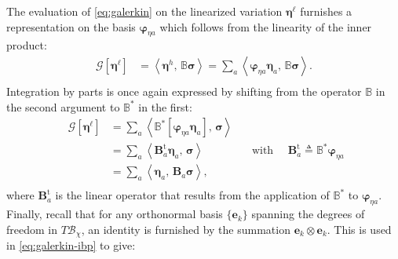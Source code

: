 The evaluation of \eqref{eq:galerkin}
on the linearized variation \(\bm{\eta}^\ell\)
furnishes a representation on the basis 
\(\bm{\varphi}_{\eta a}\) which
follows 
from the linearity of the inner product:
\begin{equation}
  \begin{aligned}
  \mathcal{G}\left[\bm{\eta}^\ell\right] &= \left< \bm{\eta}^h ,\, \mathbb{B}\bm{\sigma} \right> %
  = \sum_a \left< \bm{\varphi}^{}_{\eta a} \bm{\eta}_a ,\, \mathbb{B}\bm{\sigma} \right>. \\
  \end{aligned}
\end{equation}
Integration by parts is once again expressed by shifting
from the operator \(\mathbb{B}\) in the second argument to
\(\mathbb{B}^*\) in the first:
\begin{equation}
  \begin{aligned}
  \mathcal{G}\left[\bm{\eta}^\ell\right]&= \sum_a \left<\mathbb{B}^*_{} \left[\bm{\varphi}^{}_{\eta a} \bm{\eta}_a\right] ,\, \bm{\sigma} \right>   \\
  &= \sum_a \left< \bm{B}_a^{\mathrm{t}}\bm{\eta}_a ,\,   \bm{\sigma} \right>  \\
  &= \sum_a \left< \bm{\eta}_a ,\,  \bm{B}_a \bm{\sigma} \right>, \\
  \end{aligned}
  \quad\text{ with }\quad
  \bm{B}_a^{\mathrm{t}} \triangleq \mathbb{B}^*\bm{\varphi}^{}_{\eta a}
\label{eq:galerkin-ibp}
\end{equation}
where \(\bm{B}_a^{\mathrm{t}}\) is
the linear operator that results
from the application of 
\(\mathbb{B}^*\) to \(\bm{\varphi}^{}_{\eta a}\).
Finally, recall that for any orthonormal
basis \(\{\mathbf{e}_k\}\) spanning the degrees of freedom in
\(T\mathcal{B}_{\chi}\), an identity
is furnished by 
the summation \(\mathbf{e}_k \otimes \mathbf{e}_k\).
This is used in \eqref{eq:galerkin-ibp} to give:

